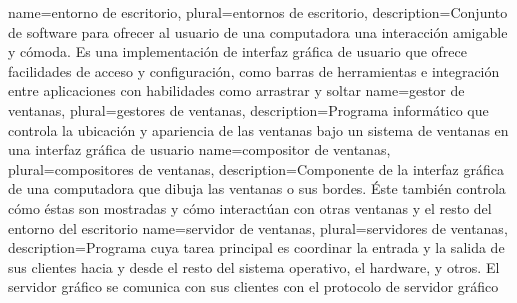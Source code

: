 {
  name={entorno de escritorio},
  plural={entornos de escritorio},
  description={Conjunto de software para ofrecer al usuario de
  una computadora una interacción amigable y cómoda. Es una
  implementación de interfaz gráfica de usuario que ofrece
  facilidades de acceso y configuración, como barras de
  herramientas e integración entre aplicaciones con habilidades
  como arrastrar y soltar}
}
{
  name={gestor de ventanas},
  plural={gestores de ventanas},
  description={Programa informático que controla la
  ubicación y apariencia de las ventanas bajo un
  sistema de ventanas en una interfaz gráfica de usuario}
}
{
  name={compositor de ventanas},
  plural={compositores de ventanas},
  description={Componente de la interfaz gráfica de una
  computadora que dibuja las ventanas o sus bordes. Éste
  también controla cómo éstas son mostradas y cómo
  interactúan con otras ventanas y el resto del entorno
  del escritorio}
}
{
  name={servidor de ventanas},
  plural={servidores de ventanas},
  description={Programa cuya tarea principal es coordinar
  la entrada y la salida de sus clientes hacia y desde el
  resto del sistema operativo, el hardware, y otros. El
  servidor gráfico se comunica con sus clientes con el
  protocolo de servidor gráfico}
}
